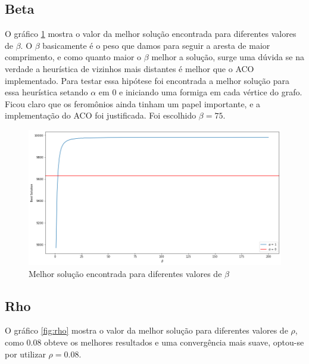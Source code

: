 \documentclass[10pt,twocolumn,letterpaper]{article}
\begin{document}
\subsection{Beta}

O gráfico \ref{fig:beta} mostra o valor da melhor solução encontrada para diferentes valores de $\beta$. O $\beta$ basicamente é o peso que damos para seguir a aresta de maior comprimento, e como quanto maior o $\beta$ melhor a solução, surge uma dúvida se na verdade a heurística de vizinhos mais distantes é melhor que o ACO implementado. Para testar essa hipótese foi encontrada a melhor solução para essa heurística setando $\alpha$ em $0$ e iniciando uma formiga em cada vértice do grafo. Ficou claro que os feromônios ainda tinham um papel importante, e a implementação do ACO foi justificada. Foi escolhido $\beta = 75$.

\begin{figure}[H]
   \begin{center}
      \includegraphics[width=\linewidth]{beta}
   \end{center}
   \caption{Melhor solução encontrada para diferentes valores de $\beta$}
   \label{fig:beta}
\end{figure}

\subsection{Rho}

O gráfico \ref{fig:rho} mostra o valor da melhor solução para diferentes valores de $\rho$, como $0.08$ obteve os melhores resultados e uma convergência mais suave, optou-se por utilizar $\rho = 0.08$.
\end{document}
